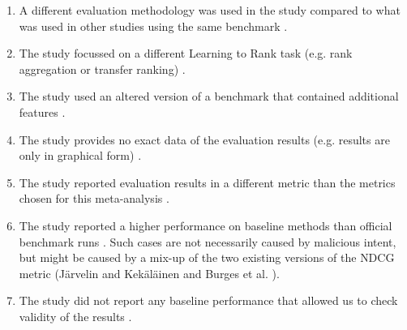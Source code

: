 \begin{enumerate}
\item A different evaluation methodology was used in the study compared to what was used in other studies using the same benchmark \cite{Geng2011, Lin2012}.
\item The study focussed on a different Learning to Rank task (e.g. rank aggregation or transfer ranking) \cite{De2011, De2010, Derhami2013, De2012, Chen2010, Ah-Pine2008, Wang2009c, De2013, Miao2013, Hoi2008, De2012b, Duh2011b, Argentini2012, Qin2010c, Volkovs2013, Desarkar2011, Pan2013, Lin2011b, Volkovs2012, Dammak2011}.
\item The study used an altered version of a benchmark that contained additional features \cite{Bidoki2009, Ding2010}.
\item The study provides no exact data of the evaluation results (e.g. results are only in graphical form) \cite{Wang2008, Wang2010, Xu2010, Kuo2009, Li2008, Xia2008, Zhou2011, Wu2011, Zhu2009, Karimzadehgan2011, Swersky2012, Pan2011, Ni2008, Ciaramita2008, Stewart2012, Petterson2009, Agarwal2010, Chang2009, Qin2008c, Adams2011, Sculley2009, Huang2008, Alejo2010, Sun2011, He2010b, Benbouzid2012, Geng2012, Chen2012, Xu2012, Shivaswamy2011}.
\item The study reported evaluation results in a different metric than the metrics chosen for this meta-analysis \cite{Yu2009, Thuy2009, Pahikkala2009, Kersting2009, Mohan2011}.
\item The study reported a higher performance on baseline methods than official benchmark runs \cite{Dubey2009, Banerjee2009, Peng2010b, Song2014, Bian2010, Bian2010b, Carvalho2008, Acharyya2012, Peng2010b, Tran2012, Asadi2013c}. Such cases are not necessarily caused by malicious intent, but might be caused by a mix-up of the two existing versions of the \ac{NDCG} metric (J{\"a}rvelin and Kek{\"a}l{\"a}inen \cite{Jarvelin2002} and Burges et al. \cite{Burges2005}). 
\item The study did not report any baseline performance that allowed us to check validity of the results \cite{Chakrabarti2008, Wang2012b, Buffoni2011}.
\end{enumerate}

